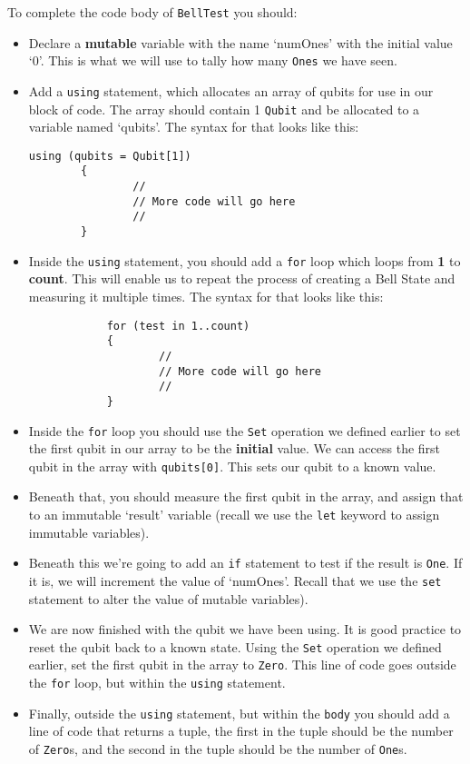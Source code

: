 \documentclass[a4paper]{article}
\begin{document}
To complete the code body of \verb$BellTest$ you should:
\begin{itemize}
\item Declare a \textbf{mutable} variable with the name `numOnes' with the initial value `0'. This is what we will use to tally how many \verb$Ones$ we have seen.
\item Add a \verb$using$ statement, which allocates an array of qubits for use in our block of code. The array should contain 1 \verb$Qubit$ and be allocated to a variable named `qubits'. The syntax for that looks like this:
\begin{lstlisting}
using (qubits = Qubit[1])
		{
				//
				// More code will go here
				//
		}
	\end{lstlisting}
\item Inside the \verb$using$ statement, you should add a \verb$for$ loop which loops from \textbf{1} to \textbf{count}. This will enable us to repeat the process of creating a Bell State and measuring it multiple times. The syntax for that looks like this:
\begin{lstlisting}
			for (test in 1..count)
			{
					//
					// More code will go here
					//
			}
	\end{lstlisting}
\item Inside the \verb$for$ loop you should use the \verb$Set$ operation we defined earlier to set the first qubit in our array to be the \textbf{initial} value. We can access the first qubit in the array with \verb$qubits[0]$. This sets our qubit to a known value.
\item Beneath that, you should measure the first qubit in the array, and assign that to an immutable `result' variable (recall we use the \verb$let$ keyword to assign immutable variables). 
\item Beneath this we're going to add an \verb$if$ statement to test if the result is \verb$One$. If it is, we will increment the value of `numOnes'. Recall that we use the \verb$set$ statement to alter the value of mutable variables).
\item We are now finished with the qubit we have been using. It is good practice to reset the qubit back to a known state. Using the \verb$Set$ operation we defined earlier, set the first qubit in the array to \verb$Zero$. This line of code goes outside the \verb$for$ loop, but within the \verb$using$ statement.
\item Finally, outside the \verb$using$ statement, but within the \verb$body$ you should add a line of code that returns a tuple, the first in the tuple should be the number of \verb$Zero$s, and the second in the tuple should be the number of \verb$One$s.\\
\end{itemize}
\end{document}
